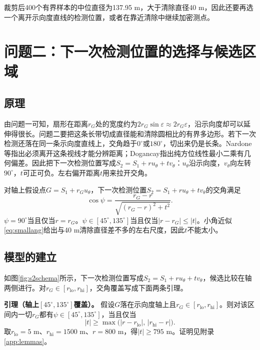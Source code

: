 \documentclass{cumcmthesis}
\begin{document}
裁剪后400个有界样本的中位直径为137.95 m，大于清除直径40 m，因此还要再选一个离开示向度直线的检测位置，或者在靠近清除中继续加密测点。

\FloatBarrier
\section{问题二：下一次检测位置的选择与候选区域}

\subsection{原理}

由问题一可知，扇形在距离$r_G$处的宽度约为$2r_G\sin\varepsilon\approx 2r_G\varepsilon$，沿示向度却可以延伸得很长。问题二要把这条长带切成直径能和清除圆相比的有界多边形。若下一次检测还落在同一条示向度直线上，交角趋于$0^\circ$或$180^\circ$，切出来仍是长条。Nardone等指出必须离开这条视线才能分辨距离\cite{nardone1984}；Dogancay指出纯方位线性最小二乘有几何偏差\cite{dogancay2005}。因此把下一次检测位置写成$S_2=S_1+r u_{\theta}+t v_{\theta}$：$u_{\theta}$沿示向度，$v_{\theta}$向左转$90^\circ$，$t$可正可负。左右偏开距离$t$用来拉开交角。

对轴上假设点$G=S_1+r_G u_{\theta}$，下一次检测位置$S_2=S_1+r u_{\theta}+t v_{\theta}$的交角满足
\begin{equation}
\cos\psi=\frac{r_G-r}{\sqrt{(r_G-r)^2+t^2}}.
\label{eq:psi}
\end{equation}
$\psi=90^\circ$当且仅当$r=r_G$。$\psi\in[45^\circ,135^\circ]$当且仅当$|r-r_G|\le|t|$。小角近似\eqref{eq:smallang}给出与40 m清除直径差不多的左右尺度，因此$t$不能太小。

\subsection{模型的建立}

如图\ref{fig:s2schema}所示，下一次检测位置写成$S_2=S_1+r u_{\theta}+t v_{\theta}$，候选比较在轴两侧进行。对$r_G\in[r_{\mathrm{lo}},r_{\mathrm{hi}}]$，交角覆盖写成下面两条引理。

\textbf{引理（轴上$[45^\circ,135^\circ]$覆盖）。} 假设$G$落在示向度轴上且$r_G\in[r_{\mathrm{lo}},r_{\mathrm{hi}}]$。则对该区间内一切$r_G$都有$\psi\in[45^\circ,135^\circ]$，当且仅当
\begin{equation}
|t|\ge\max\bigl(|r-r_{\mathrm{lo}}|,\,|r_{\mathrm{hi}}-r|\bigr).
\label{eq:psiband}
\end{equation}
取$r_{\mathrm{lo}}=5$ m、$r_{\mathrm{hi}}=1500$ m、$r=800$ m，得$|t|\ge 795$ m。证明见附录\ref{app:lemmas}。
\end{document}
